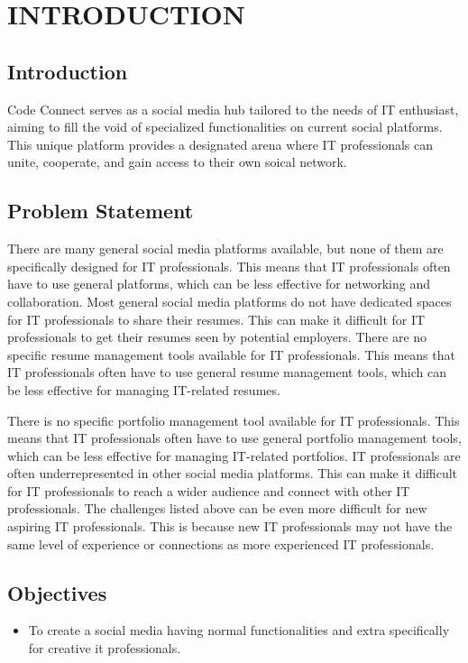\chapter{INTRODUCTION}



\section{Introduction}

Code Connect serves as a social media hub tailored to the needs of IT enthusiast, aiming to fill the void of specialized functionalities on current social platforms. This unique platform provides a designated arena where IT professionals can unite, cooperate, and gain access to their own soical network.
\section{Problem Statement}

There are many general social media platforms available, but none of them are specifically designed for IT professionals. This means that IT professionals often have to use general platforms, which can be less effective for networking and collaboration.
Most general social media platforms do not have dedicated spaces for IT professionals to share their resumes. This can make it difficult for IT professionals to get their resumes seen by potential employers.
There are no specific resume management tools available for IT professionals. This means that IT professionals often have to use general resume management tools, which can be less effective for managing IT-related resumes.

There is no specific portfolio management tool available for IT professionals. This means that IT professionals often have to use general portfolio management tools, which can be less effective for managing IT-related portfolios.
IT professionals are often underrepresented in other social media platforms. This can make it difficult for IT professionals to reach a wider audience and connect with other IT professionals.
The challenges listed above can be even more difficult for new aspiring IT professionals. This is because new IT professionals may not have the same level of experience or connections as more experienced IT professionals.
\section{Objectives}
\begin{itemize}
  \item To create a social media having normal functionalities and extra specifically  for creative it professionals.
\end{itemize}
